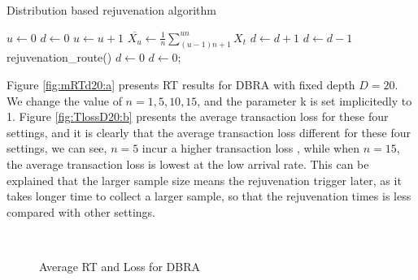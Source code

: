 \documentclass[10pt,journal,letterpaper,compsoc]{IEEEtran}
\begin{document}
\begin{algorithm}
\caption{Distribution based rejuvenation algorithm}
\label{alg:DBRA}
\begin{algorithmic}[1]
    \State $u\gets 0$
    \State $d\gets 0$
        \State $u\gets u+1$
        \State $\overline{X_u}\gets \frac{1}{n}\sum^{un}_{(u-1)n+1}X_t$
            \State $d\gets d+1$
        \Else
            \State $d\gets d-1$
        \EndIf
            \State rejuvenation\_route()
            \State $d\gets 0$
        \EndIf
            \State $d\gets 0$;
        \EndIf
    \EndWhile
\EndFunction
\end{algorithmic}
\end{algorithm}

Figure \ref{fig:mRTd20:a} presents RT results for DBRA
with fixed depth $D=20$. We change the value of $n=1,5,10,15$, and
the parameter k is set implicitedly to 1.
Figure \ref{fig:TlossD20:b} presents the average transaction loss for these four
settings,
and it is clearly that the average transaction loss different for these four settings,
we can see, $n=5$  incur a higher transaction loss
, while when $n=15$,
the average transaction loss is lowest at the low arrival rate.
This can be explained that the larger sample size means the rejuvenation
trigger later, as it takes longer time to collect a larger sample,
so that the rejuvenation times is less compared with other settings.

\begin{figure}[htb]
\centering
{}
\\
\caption{Average RT and Loss for DBRA}
\end{figure}
\end{document}
